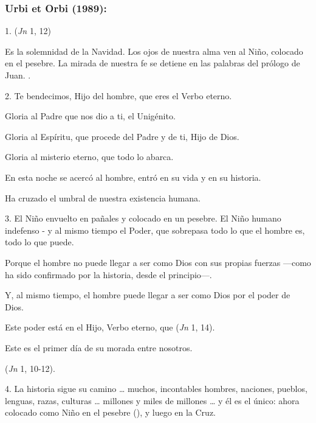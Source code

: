 					\subsubsection{Urbi et Orbi (1989):}

						\begin{body}
							1.  (\emph{Jn} 1, 12)
							
							Es la solemnidad de la Navidad. Los ojos de nuestra alma ven al Niño, colocado en el pesebre. La mirada de nuestra fe se detiene en las palabras del prólogo de Juan. .
							
							2. Te bendecimos, Hijo del hombre, que eres el Verbo eterno.
							
							Gloria al Padre que nos dio a ti, el Unigénito.
							
							Gloria al Espíritu, que procede del Padre y de ti, Hijo de Dios.
							
							Gloria al misterio eterno, que todo lo abarca.
							
							En esta noche se acercó al hombre, entró en su vida y en su historia.
							
							Ha cruzado el umbral de nuestra existencia humana.
							
							3. El Niño envuelto en pañales y colocado en un pesebre. El Niño humano indefenso - y al mismo tiempo el Poder, que sobrepasa todo lo que el hombre es, todo lo que puede.
							
							Porque el hombre no puede llegar a ser como Dios con sus propias fuerzas ---como ha sido confirmado por la historia, desde el principio---.
							
							Y, al mismo tiempo, el hombre puede llegar a ser como Dios por el poder de Dios.
							
							Este poder está en el Hijo, Verbo eterno, que  (\emph{Jn} 1, 14).
							
							Este es el primer día de su morada entre nosotros.
							
							 (\emph{Jn} 1, 10-12).
							
							4. La historia sigue su camino \ldots{} muchos, incontables hombres, naciones, pueblos, lenguas, razas, culturas \ldots{} millones y miles de millones \ldots{} y él es el único: ahora colocado como Niño en el pesebre (), y luego en la Cruz.
							

\end{body}

